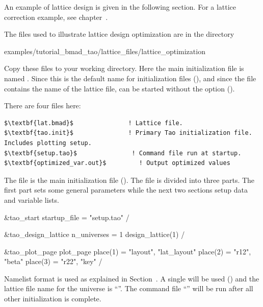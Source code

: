 \documentclass{hitec}     %
\begin{document}
An example of lattice design is given in the following section. For a lattice correction example, see 
chapter~.

The files used to illustrate lattice design optimization are in the directory 
\begin{code}
examples/tutorial_bmad_tao/lattice_files/lattice_optimization
\end{code}
Copy these files to your working directory. Here the main initialization file is named
. Since this is the default name for initialization files (), and
since the  file contains the name of the lattice file, \tao can be started without the
 option ().

There are four files here:
\begin{lstlisting}[mathescape]
$\textbf{lat.bmad}$               ! Lattice file.
$\textbf{tao.init}$               ! Primary Tao initialization file. Includes plotting setup.
$\textbf{setup.tao}$               ! Command file run at startup.
$\textbf{optimized_var.out}$         ! Output optimized values
\end{lstlisting}

The file  is the main initialization file (). The file is divided
into three parts. The first part sets some general parameters while the next two sections setup data
 and variable  lists.
\begin{code}
&tao_start
  startup_file = "setup.tao"
/

&tao_design_lattice
  n_universes = 1
  design_lattice(1)%
/

&tao_plot_page
  plot_page%
  place(1) = "layout", "lat_layout"
  place(2) = "r12", "beta"
  place(3) = "r22", "key"
/
\end{code}
Namelist format is used as explained in Section~. A single  will be
used () and the lattice file name for the universe is ``''. The
command file ``'' will be run after all other initialization is complete.
\end{document}
